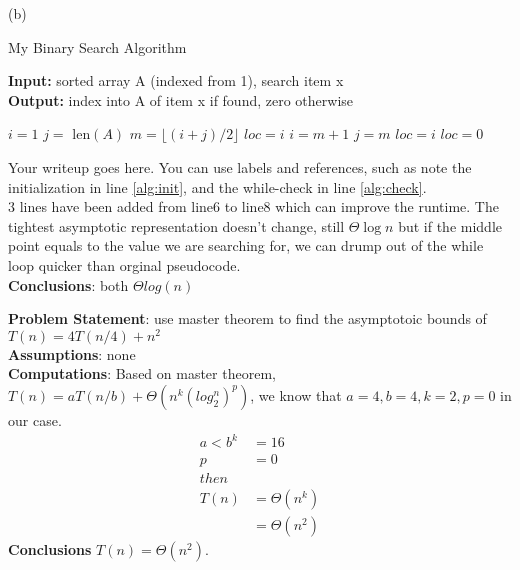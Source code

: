 \documentclass[12pt]{article}
\newenvironment{proposition}[2][Proposition]{\begin{trivlist}
\item[\hskip \labelsep {\bfseries #1}\hskip \labelsep {\bfseries #2.}]}{\end{trivlist}}
\begin{document}
(b) 	    \begin{algorithm}[H]
	        \caption{My Binary Search Algorithm}
	        \textbf{Input:} sorted array A (indexed from 1), search item x \\
	        \textbf{Output:} index into A of item x if found, zero otherwise
	        \begin{algorithmic}[1]
	            \State $i = 1$  \label{alg:init}
	            \State $j =$ len$(A)$ 
	                \label{alg:check}
	                \State $m = \lfloor(i+j)/2\rfloor$ 
	                     \State $loc = i$
	                \EndIf
	                  \label{a2:ifcheck}
	                     \State $i = m+1$        
	                \Else \label{a2:else}
	                    \State $j = m$          
	                \EndIf
	            \EndWhile
	              \label{a2:eqcheck}
	                \State $loc = i$
		 \Else 
		 	\State $loc = 0$
		\EndIf
	    \EndFunction
	    \end{algorithmic}
	    \end{algorithm}

Your writeup goes here.  You can use labels and references, such as note the initialization in line \ref{alg:init}, and the while-check in line \ref{alg:check}. \\

3 lines have been added from line6 to line8 which can improve the runtime. The tightest asymptotic representation doesn't change, still $\Theta{\log n}$ but if the middle point equals to the value we are searching for, we can drump out of the while loop quicker than orginal pseudocode.\\
\textbf{Conclusions}: both $\Theta log(n)$\\ 
 

\begin{proposition}{3}
\end{proposition}
\setlength{\parindent}{0pt}
\textbf{Problem Statement}: use master theorem to find the asymptotoic bounds of $T(n) = 4T(n/4) +n^2$\\
\textbf{Assumptions}: none\\
\textbf{Computations}: Based on master theorem,$T(n) = aT(n/b) + \Theta(n^k (log_2^n)^p)$, we know that $a = 4, b = 4, k=2, p=0$ in our case.\\
\begin{align*}
    a < b^k &=16 \\
    p &= 0 \\
    then \\
    T(n) & = \Theta(n^k) \\
    & = \Theta(n^2)
\end{align*}
\textbf{Conclusions} $T(n) = \Theta(n^2)$.
\end{document}
